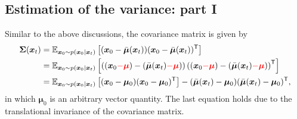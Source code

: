 \subsection{Estimation of the variance: part I}
Similar to the above discussions, the covariance matrix is given by
\begin{align}
    \bm{\Sigma}(\bm{x}_{t}) &= \mathbb{E}_{\bm{x}_0\sim p(\bm{x}_0|\bm{x}_{t})}\left[ (\bm{x}_0-\bar{\bm{\mu}}(\bm{x}_{t}))(\bm{x}_0-\bar{\bm{\mu}}(\bm{x}_{t}))^{\mathsf{T}} \right]\nonumber \\
    &= \mathbb{E}_{\bm{x}_0\sim p(\bm{x}_0|\bm{x}_{t})}\left[ \left( (\bm{x}_0\textcolor{red}{-\bm{\mu}})-(\bar{\bm{\mu}}(\bm{x}_{t})\textcolor{red}{-\bm{\mu}})  \right) \left( (\bm{x}_0\textcolor{red}{-\bm{\mu}})-(\bar{\bm{\mu}}(\bm{x}_{t})\textcolor{red}{-\bm{\mu}})  \right) ^{\mathsf{T}}\right]\nonumber\\
    &=\mathbb{E}_{\bm{x}_0\sim p(\bm{x}_0|\bm{x}_{t})}\left[(\bm{x}_0-\bm{\mu}_0)(\bm{x}_0-\bm{\mu}_0)^{\mathsf{T}} \right] - (\bar{\bm{\mu}}(\bm{x}_{t})-\bm{\mu}_0)(\bar{\bm{\mu}}(\bm{x}_{t})-\bm{\mu}_0)^{\mathsf{T}}, \label{eq:7.8}
\end{align}
in which $\bm{\mu}_0$ is an arbitrary vector quantity. The last equation holds due to the translational invariance of the covariance matrix. 

